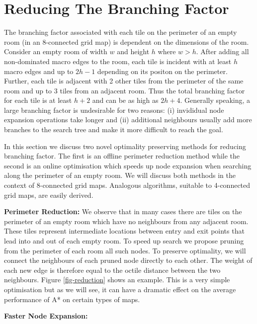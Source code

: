 \section{Reducing The Branching Factor}
The branching factor associated with each tile on the perimeter of an empty room (in an 8-connected 
grid map) is dependent on the dimensions of the room.
Consider an empty room of width $w$ and height $h$ where $w > h$.
After adding all non-dominated macro edges to the room, each tile is incident with at least $h$ macro edges and up to $2h-1$ 
depending on its positon on the perimeter.
Further, each tile is adjacent with 2 other tiles from the perimeter of the same room and up to 3 tiles from an adjacent room.
Thus the total branching factor for each tile is at least $h + 2$ and can be as high
as $2h + 4$.
Generally speaking, a large branching factor is undesirable for two reasons:
(i) invididual node expansion operations take longer and (ii) additional neighbours usually 
add more branches to the search tree and make it more difficult to reach the goal.
\par
In this section we discuss two novel optimality preserving methods for reducing branching factor. 
The first is an offline perimeter reduction method while the second is an online optimisation which speeds up 
node expansion when searching along the perimeter of an empty room.
We will discuss both methods in the context of 8-connected grid maps.
Analogous algorithms, suitable to 4-connected grid maps, are easily derived.
\par \noindent \newline
\textbf{Perimeter Reduction:}
We observe that in many cases there are tiles on the perimeter of an empty room which have no neighbours from any 
adjacent room. 
These tiles represent intermediate locations between entry and exit points that lead into and out of each empty room.
To speed up search we propose pruning from the perimeter of each room all such nodes.
To preserve optimality, we will connect the neighbours of each pruned node directly to each other.
The weight of each new edge is therefore equal to the octile distance between the two neighbours.
Figure \ref{fig-reduction} shows an example.
This is a very simple optimisation but as we will see, it can have a dramatic effect on the average performance of
A* on certain types of maps.
\par \noindent \newline
\textbf{Faster Node Expansion:} 

